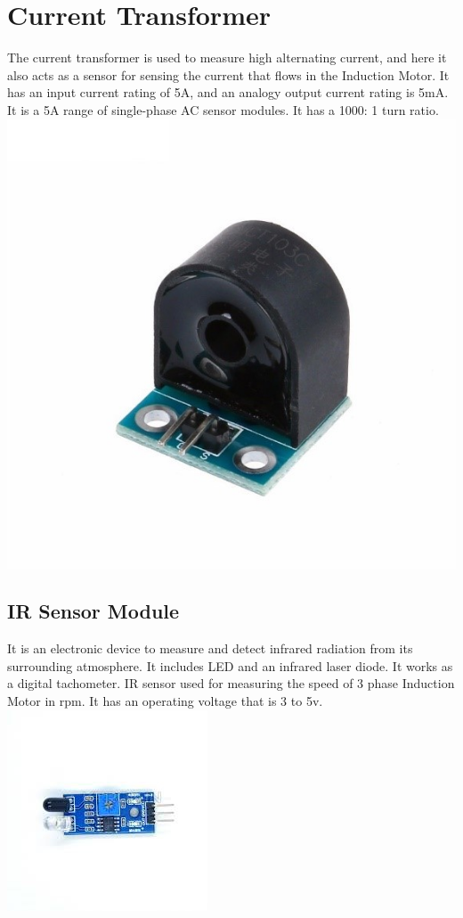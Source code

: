 \section{Current Transformer}
The current transformer is used to measure high alternating current, and here it also acts as a sensor for sensing the current that flows in the Induction Motor. It has an input current rating of 5A, and an analogy output current rating is 5mA. It is a 5A range of single-phase AC sensor modules. It has a 1000: 1 turn ratio.\\
{\includegraphics[height=0.2\textheight]{Figures/trans.jpg}}
\subsection{IR Sensor Module}
It is an electronic device to measure and detect infrared radiation from its surrounding atmosphere. It includes LED and an infrared laser diode. It works as a digital tachometer. IR sensor used for measuring the speed of 3 phase Induction Motor in rpm. It has an operating voltage that is 3 to 5v.\\
{\includegraphics[height=0.2\textheight]{Figures/ir.jpg}}
